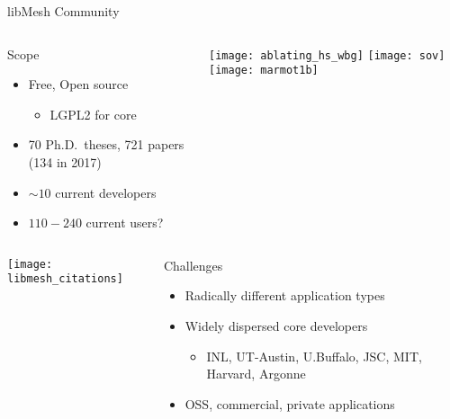\begin{frame}{libMesh Community}
\begin{columns}
\begin{block}{Scope}
\begin{itemize}
\item Free, Open source
\begin{itemize}
\item LGPL2 for core
\end{itemize}
\item 70 Ph.D.\ theses, 721 papers (134 in 2017)
\item $\sim10$ current developers
\item $110-240$ current users?
\end{itemize}
\end{block}

\texttt{[image: ablating\_hs\_wbg]}
\texttt{[image: sov]}
\texttt{[image: marmot1b]}
\end{columns}

\begin{columns}
\texttt{[image: libmesh\_citations]}

\begin{block}{Challenges}
\begin{itemize}
\item Radically different application types
\item Widely dispersed core developers
\begin{itemize}
\item INL, UT-Austin, U.Buffalo, JSC, MIT, Harvard, Argonne
\end{itemize}
\item OSS, commercial, private applications
\end{itemize}
\end{block}
\end{columns}

\end{frame}




